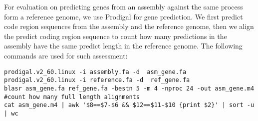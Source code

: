 \documentclass[11pt]{article}
\begin{document}
For evaluation on predicting genes from an assembly against the same process form a reference genome, we use Prodigal\cite{Hyatt20211023} for gene prediction. We first predict code region sequences from the assembly and the reference genome, then we align the predict coding region sequence to count how many predictions in the assembly have the same predict length in the reference genome. The following commands are used for such assessment:

\begin{verbatim}
prodigal.v2_60.linux -i assembly.fa -d  asm_gene.fa
prodigal.v2_60.linux -i reference.fa -d  ref_gene.fa
blasr asm_gene.fa ref_gene.fa -bestn 5 -m 4 -nproc 24 -out asm_gene.m4
#count how many full length alignments
cat asm_gene.m4 | awk '$8==$7-$6 && $12==$11-$10 {print $2}' | sort -u | wc  
\end{verbatim}
{}

\end{document}
